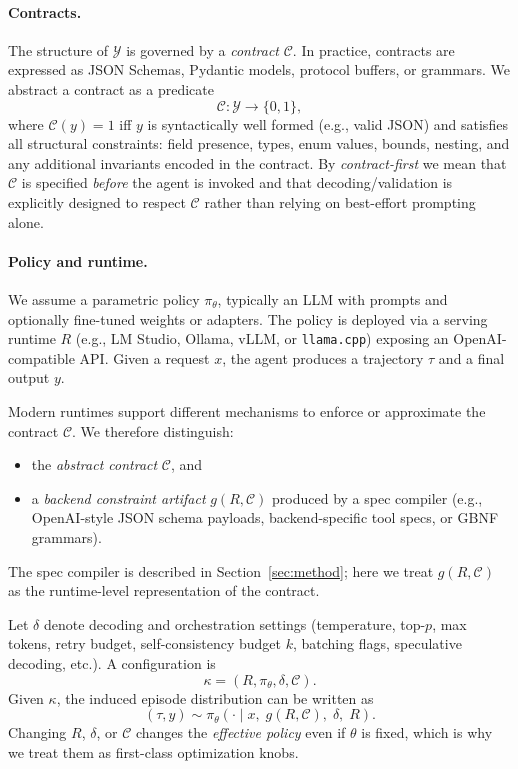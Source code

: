 \paragraph{Contracts.}
The structure of $\mathcal{Y}$ is governed by a \emph{contract} $\mathcal{C}$.
In practice, contracts are expressed as JSON Schemas, Pydantic models, protocol buffers, or grammars.
We abstract a contract as a predicate
\[
\mathcal{C}:\mathcal{Y}\rightarrow\{0,1\},
\]
where $\mathcal{C}(y)=1$ iff $y$ is syntactically well formed (e.g., valid JSON) and satisfies all structural constraints:
field presence, types, enum values, bounds, nesting, and any additional invariants encoded in the contract.
By \emph{contract-first} we mean that $\mathcal{C}$ is specified \emph{before} the agent is invoked and that decoding/validation is explicitly designed to respect $\mathcal{C}$ rather than relying on best-effort prompting alone.

\paragraph{Policy and runtime.}
We assume a parametric policy $\pi_\theta$, typically an LLM with prompts and optionally fine-tuned weights or adapters.
The policy is deployed via a serving runtime $R$ (e.g., LM Studio, Ollama, vLLM, or \texttt{llama.cpp}) exposing an OpenAI-compatible API.
Given a request $x$, the agent produces a trajectory $\tau$ and a final output $y$.

Modern runtimes support different mechanisms to enforce or approximate the contract $\mathcal{C}$.
We therefore distinguish:
\begin{itemize}[leftmargin=12pt]
    \item the \emph{abstract contract} $\mathcal{C}$, and
    \item a \emph{backend constraint artifact} $g(R,\mathcal{C})$ produced by a spec compiler (e.g., OpenAI-style JSON schema payloads, backend-specific tool specs, or GBNF grammars).
\end{itemize}
The spec compiler is described in Section~\ref{sec:method}; here we treat $g(R,\mathcal{C})$ as the runtime-level representation of the contract.

Let $\delta$ denote decoding and orchestration settings (temperature, top-$p$, max tokens, retry budget, self-consistency budget $k$, batching flags, speculative decoding, etc.).
A configuration is
\[
\kappa = (R,\pi_\theta,\delta,\mathcal{C}).
\]
Given $\kappa$, the induced episode distribution can be written as
\[
(\tau,y) \sim \pi_\theta(\cdot \mid x,\; g(R,\mathcal{C}),\; \delta,\; R).
\]
Changing $R$, $\delta$, or $\mathcal{C}$ changes the \emph{effective policy} even if $\theta$ is fixed, which is why we treat them as first-class optimization knobs.

